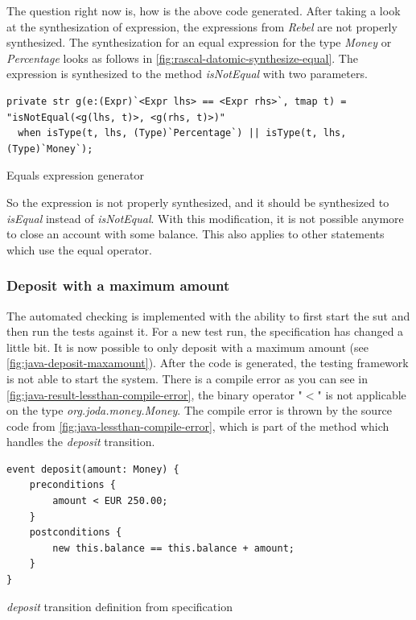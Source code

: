 The question right now is, how is the above code generated. After taking a look at the synthesization of
expression, the expressions from \textit{Rebel} are not properly synthesized. The
synthesization for an equal expression for the type \textit{Money} or \textit{Percentage} looks as
follows in \autoref{fig:rascal-datomic-synthesize-equal}. The expression is
synthesized to the method \textit{isNotEqual} with two parameters.

\begin{sourcecode}[h!]
\begin{lstlisting}[]
private str g(e:(Expr)`<Expr lhs> == <Expr rhs>`, tmap t) = "isNotEqual(<g(lhs, t)>, <g(rhs, t)>)"
  when isType(t, lhs, (Type)`Percentage`) || isType(t, lhs, (Type)`Money`);
\end{lstlisting}
\caption{Equals expression generator}\label{fig:rascal-datomic-synthesize-equal}
\end{sourcecode}
\FloatBarrier

So the expression is not properly synthesized, and it should be synthesized to
\textit{isEqual} instead of \textit{isNotEqual}. With this modification, it
is not possible anymore to close an account with some balance. This also applies
to other statements which use the equal operator.

\subsubsection{Deposit with a maximum amount}\label{sec:bug-compile-max-deposit}

The automated checking is implemented with the ability to first start the
\gls{sut} and then run the tests against it. For a new test run, the
specification has changed a little bit. It is now possible to only deposit with
a maximum amount (see \autoref{fig:java-deposit-maxamount}). After the code is
generated, the testing framework is not able to start the system. There is a
compile error as you can see in
\autoref{fig:java-result-lessthan-compile-error}, the binary operator "$<$"
is not applicable on the type \textit{org.joda.money.Money}. The compile error
is thrown by the source code from \autoref{fig:java-lessthan-compile-error},
which is part of the method which handles the \textit{deposit} transition.


\begin{sourcecode}[h!]
\begin{lstlisting}[]
event deposit(amount: Money) {
	preconditions {
		amount < EUR 250.00;
	}
	postconditions {
		new this.balance == this.balance + amount;
	}
}
\end{lstlisting}
\caption{\textit{deposit} transition definition from specification}\label{fig:java-deposit-maxamount}
\end{sourcecode}
\FloatBarrier

